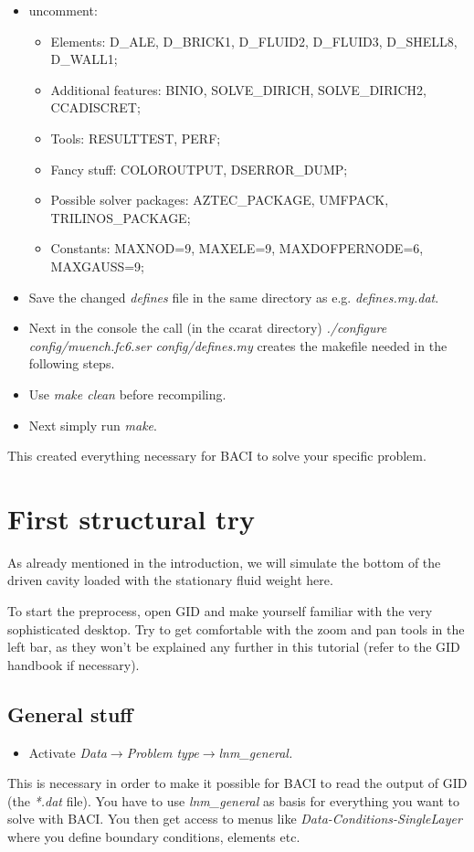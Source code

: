 \begin{itemize}
\item uncomment:

\begin{itemize}
\item Elements: D\_ALE, D\_BRICK1, D\_FLUID2, D\_FLUID3, D\_SHELL8, D\_WALL1;
\item Additional features: BINIO, SOLVE\_DIRICH, SOLVE\_DIRICH2, CCADISCRET;
\item Tools: RESULTTEST, PERF;
\item Fancy stuff: COLOROUTPUT, DSERROR\_DUMP;
\item Possible solver packages: AZTEC\_PACKAGE, UMFPACK, TRILINOS\_PACKAGE;
\item Constants: MAXNOD=9, MAXELE=9, MAXDOFPERNODE=6, MAXGAUSS=9;
\end{itemize}
\item Save the changed \emph{defines} file in the same directory as e.g.
\emph{defines.my.dat}. 
\item Next in the console the call (in the ccarat directory) \emph{./configure
config/muench.fc6.ser config/defines.my} creates the makefile needed
in the following steps. 
\item Use \emph{make clean} before recompiling. 
\item Next simply run \emph{make}.
\end{itemize}
This created everything necessary for BACI to solve your specific
problem.


\section{First structural try}

As already mentioned in the introduction, we will simulate the bottom
of the driven cavity loaded with the stationary fluid weight here.

To start the preprocess, open GID and make yourself familiar with
the very sophisticated desktop. Try to get comfortable with the zoom
and pan tools in the left bar, as they won't be explained any further
in this tutorial (refer to the GID handbook if necessary).


\subsection{General stuff}

\begin{itemize}
\item Activate \emph{Data$\to$Problem type$\to$lnm\_general.}
\end{itemize}
This is necessary in order to make it possible for BACI to read the
output of GID (the \emph{{*}.dat} file). You have to use \emph{lnm\_general}
as basis for everything you want to solve with BACI. You then get
access to menus like \emph{Data-Conditions-SingleLayer} where you
define boundary conditions, elements etc.

